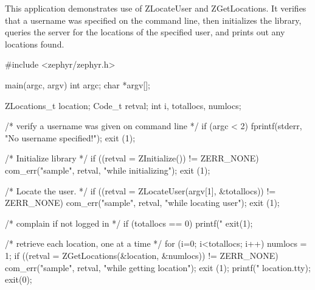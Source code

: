 This application demonstrates use of ZLocateUser and ZGetLocations.  It
verifies that a username was specified on the command line, then
initializes the library, queries the server for the locations of the
specified user, and prints out any locations found.

\begin{code}
#include <zephyr/zephyr.h>

main(argc, argv)
    int argc;
    char *argv[];
{
    ZLocations_t location;
    Code_t retval;
    int i, totallocs, numlocs;

    /* verify a username was given on command line */
    if (argc < 2) {
        fprintf(stderr, "No username specified!\n");
        exit (1);
    }

    /* Initialize library */
    if ((retval = ZInitialize()) != ZERR_NONE) {
        com_err("sample", retval, "while initializing");
        exit (1);
    }

    /* Locate the user. */
    if ((retval = ZLocateUser(argv[1], &totallocs)) != ZERR_NONE) {
        com_err("sample", retval, "while locating user");
        exit (1);
    }

    /* complain if not logged in */
    if (totallocs == 0) {
        printf("%
        exit(1);
    }

    /* retrieve each location, one at a time */
    for (i=0; i<totallocs; i++) {
        numlocs = 1;
        if ((retval = ZGetLocations(&location, &numlocs)) != ZERR_NONE) {
            com_err("sample", retval, "while getting location");
            exit (1);
        }
        printf("%
            location.tty);
    }
    exit(0);
}
\end{code}
